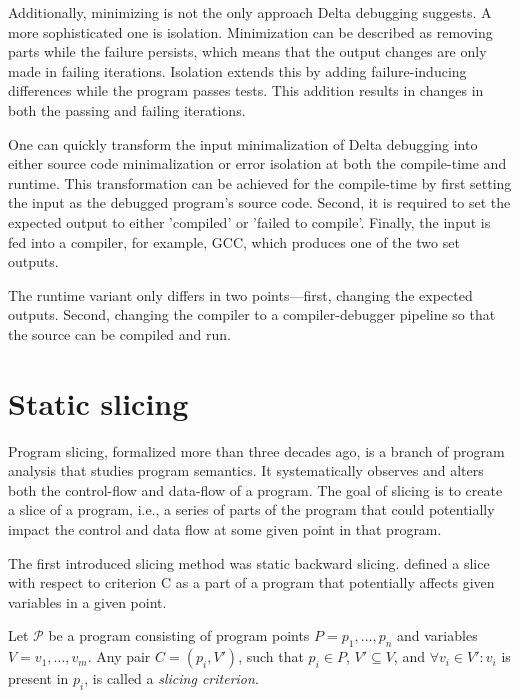 Additionally, minimizing is not the only approach Delta debugging suggests.
A more sophisticated one is isolation. Minimization can be described as removing parts
while the failure persists, which means that the output changes are only made in failing
iterations.
Isolation extends this by adding failure-inducing differences while the program passes tests.
This addition results in changes in both the passing and failing iterations.

One can quickly transform the input minimalization of Delta debugging into either source
code minimalization or error isolation at both the compile-time and runtime.
This transformation can be achieved for the compile-time by first setting the input
as the debugged program's source code. 
Second, it is required to set the expected
output to either 'compiled' or 'failed to compile'. 
Finally, the input is fed into a compiler, for example, GCC, which produces
one of the two set outputs. 

The runtime variant only differs in two points—first, changing the expected outputs. 
Second, changing the compiler to a compiler-debugger pipeline so that the source 
can be compiled and run.

\section{Static slicing}

Program slicing, formalized more than three decades ago,
is a branch of program analysis that studies program semantics.
It systematically observes and alters both the control-flow 
and data-flow of a program.  
The goal of slicing is to create a slice of a program,
i.e., a series of parts of the program that could potentially
impact the control and data flow at some given point in that program. 

The first introduced slicing method was static backward slicing. 
\citet{Weiser84}
defined a slice with respect to criterion C 
as a part of a program that potentially affects given variables in a given point. 

\begin{defn}\label{def02:5}
  Let $\mathcal{P}$ be a program consisting of program points 
  $P = p_1,\dots,p_n$ and variables $V = v_1,\dots,v_m$.
  Any pair $C = (p_i, V')$, such that $p_i \in P$, $V' \subseteq V$, and 
  $\forall v_i \in V': v_i$ is present in $p_i$, 
  is called a \emph{slicing criterion}.
\end{defn}

